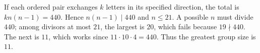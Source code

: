 If each ordered pair exchanges $k$ letters in its specified direction, the total is $kn(n-1)=440$. Hence $n(n-1)\mid440$ and $n\le21$. A possible $n$ must divide $440$; among divisors at most $21$, the largest is $20$, which fails because $19\nmid440$. The next is $11$, which works since $11\cdot10\cdot4=440$. Thus the greatest group size is $\boxed{11}$.
